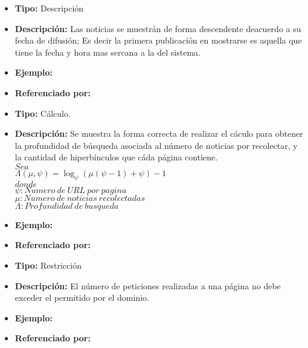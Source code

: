 \begin{itemize}
  \item \textbf{Tipo:} Descripción
  \item \textbf{Descripción:} Las noticias se muestrán de forma descendente deacuerdo a su fecha de difusión; Es decir la primera publicación en mostrarse es aquella que tiene la fecha y hora mas sercana a la del sistema.
  \item \textbf{Ejemplo:} 
  \item \textbf{Referenciado por:}  \\
\end{itemize}


\begin{itemize}
  \item \textbf{Tipo:} Cálculo.
  \item \textbf{Descripción:} Se muestra la forma correcta de realizar el cáculo para obtener la profundidad de búsqueda asociada al número de noticias por recolectar, y la cantidad de hiperbínculos que cáda página contiene.\\
 
  $Sea$\\

  $\Lambda(\mu,\psi)=\log_{\psi}{(\mu(\psi-1)+\psi)}-1$\\

  $donde$\\
  $\psi:Numero\ de\ URL\ por\ pagina$\\
  $\mu:Numero\ de\ noticias\ recolectadas$\\
  $\Lambda:Profundidad\ de\ busqueda$\\



  \item \textbf{Ejemplo:} 
  \item \textbf{Referenciado por:} \\
\end{itemize}


\begin{itemize}
  \item \textbf{Tipo:} Restricción
  \item \textbf{Descripción:} El número de peticiones realizadas a una página no debe exceder el permitido por el dominio.
  \item \textbf{Ejemplo:} 
  \item \textbf{Referenciado por:}  \\
\end{itemize}

